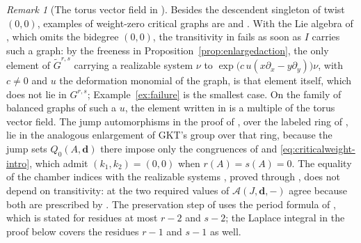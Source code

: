 \documentclass[11pt]{amsart}
\theoremstyle{definition}
\theoremstyle{remark}
\newtheorem{remark}[theorem]{Remark}
\begin{document}
\begin{remark}[The torus vector field in {\cite{GKT}}]
\label{rem:marginalGKT}
Besides the descendent singleton of twist $(0,0)$, examples of weight-zero
critical graphs are \cite[Example~2.38]{GKT} and
\cite[Example~4.9]{GKTsurvey}.  With the Lie algebra of
\cite[Definition~4.23]{GKT}, which omits the bidegree $(0,0)$, the
transitivity in \cite[Theorems~0.7 and~4.27]{GKT} fails as soon as $I$
carries such a graph: by the freeness in
Proposition~\ref{prop:enlargedaction}, the only element of
$\widetilde G^{r,s}$ carrying a realizable system $\nu$ to
$\exp\bigl(c\,u(x\partial_x-y\partial_y)\bigr)\nu$, with $c\ne0$ and $u$ the
deformation monomial of the graph, is that element itself, which does not
lie in $G^{r,s}$; Example~\ref{ex:failure} is the smallest case.  On the
family of balanced graphs of such a $u$, the element written in
\cite[proof of Theorem~4.27, Step~3]{GKT} is a multiple of the torus vector
field.  The jump automorphisms in the proof of \cite[Theorem~5.9]{GKT}, over
the labeled ring of \cite[Definition~4.6]{GKT}, lie in the analogous
enlargement of GKT's group over that ring, because the jump sets
$Q_0(A,\mathbf d)$ there impose only the congruences of
\cite[Definition~4.23]{GKT} and \eqref{eq:criticalweight-intro}, which admit
$(k_1,k_2)=(0,0)$ when $r(A)=s(A)=0$.  The equality of the chamber indices with the
realizable systems \cite[Corollary~5.14]{GKT}, proved through
\cite[Theorem~5.13]{GKT}, does not depend on transitivity: at
\cite[(5.50)]{GKT} the two required values of $\mathcal A(J,\mathbf d,-)$ agree
because both are prescribed by \cite[Definition~3.47]{GKT}.  The preservation
step of \cite[proof of Theorem~4.27, Step~1]{GKT} uses the period formula of
\cite[Theorem~4.9]{GKT}, which is stated for residues at most $r-2$ and
$s-2$; the Laplace integral in the proof below covers the residues $r-1$ and
$s-1$ as well.
\end{remark}
\end{document}
